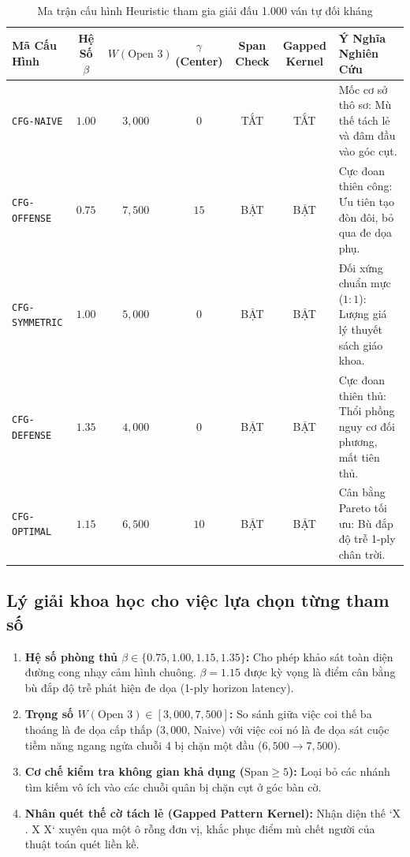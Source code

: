 \documentclass[11pt,a4paper]{article}
\begin{document}
\begin{table}[htbp]
\centering
\small
\caption{Ma trận cấu hình Heuristic tham gia giải đấu 1.000 ván tự đối kháng}
\label{tab:heuristic_profiles}
\begin{tabularx}{\textwidth}{l c c c c c X}
\toprule
\textbf{Mã Cấu Hình} & \textbf{Hệ Số $\beta$} & \textbf{$W(\text{Open 3})$} & \textbf{$\gamma$ (Center)} & \textbf{Span Check} & \textbf{Gapped Kernel} & \textbf{Ý Nghĩa Nghiên Cứu} \\
\midrule
\texttt{CFG-NAIVE}     & $1.00$ & $3{,}000$ & $0$  & TẮT & TẮT & Mốc cơ sở thô sơ: Mù thế tách lẻ và đâm đầu vào góc cụt. \\
\texttt{CFG-OFFENSE}   & $0.75$ & $7{,}500$ & $15$ & BẬT & BẬT & Cực đoan thiên công: Ưu tiên tạo đòn đôi, bỏ qua đe dọa phụ. \\
\texttt{CFG-SYMMETRIC} & $1.00$ & $5{,}000$ & $0$  & BẬT & BẬT & Đối xứng chuẩn mực ($1:1$): Lượng giá lý thuyết sách giáo khoa. \\
\texttt{CFG-DEFENSE}   & $1.35$ & $4{,}000$ & $0$  & BẬT & BẬT & Cực đoan thiên thủ: Thổi phồng nguy cơ đối phương, mất tiên thủ. \\
\texttt{CFG-OPTIMAL}   & $1.15$ & $6{,}500$ & $10$ & BẬT & BẬT & Cân bằng Pareto tối ưu: Bù đắp độ trễ 1-ply chân trời. \\
\bottomrule
\end{tabularx}
\end{table}

\subsection{Lý giải khoa học cho việc lựa chọn từng tham số}
\begin{enumerate}
    \item \textbf{Hệ số phòng thủ $\beta \in \{0.75, 1.00, 1.15, 1.35\}$:} Cho phép khảo sát toàn diện đường cong nhạy cảm hình chuông. $\beta = 1.15$ được kỳ vọng là điểm cân bằng bù đắp độ trễ phát hiện đe dọa (1-ply horizon latency).
    \item \textbf{Trọng số $W(\text{Open 3}) \in [3{,}000, 7{,}500]$:} So sánh giữa việc coi thế ba thoáng là đe dọa cấp thấp ($3{,}000$, Naive) với việc coi nó là đe dọa sát cuộc tiềm năng ngang ngửa chuỗi 4 bị chặn một đầu ($6{,}500 \to 7{,}500$).
    \item \textbf{Cơ chế kiểm tra không gian khả dụng ($\text{Span} \ge 5$):} Loại bỏ các nhánh tìm kiếm vô ích vào các chuỗi quân bị chặn cụt ở góc bàn cờ.
    \item \textbf{Nhân quét thế cờ tách lẻ (Gapped Pattern Kernel):} Nhận diện thế `X . X X` xuyên qua một ô rỗng đơn vị, khắc phục điểm mù chết người của thuật toán quét liền kề.
\end{enumerate}
\end{document}
